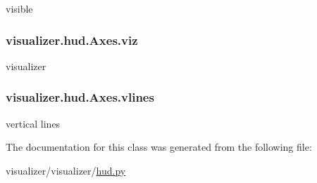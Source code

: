 visible 

\subsubsection[{\texorpdfstring{viz}{viz}}]{\setlength{\rightskip}{0pt plus 5cm}visualizer.\+hud.\+Axes.\+viz}\hypertarget{classvisualizer_1_1hud_1_1Axes_a2ef949d1777934b9f320356f5f78f250}{}\label{classvisualizer_1_1hud_1_1Axes_a2ef949d1777934b9f320356f5f78f250}


visualizer 

\subsubsection[{\texorpdfstring{vlines}{vlines}}]{\setlength{\rightskip}{0pt plus 5cm}visualizer.\+hud.\+Axes.\+vlines}\hypertarget{classvisualizer_1_1hud_1_1Axes_a31139415c2a30668137184f4ef88d948}{}\label{classvisualizer_1_1hud_1_1Axes_a31139415c2a30668137184f4ef88d948}


vertical lines 



The documentation for this class was generated from the following file\+:\begin{DoxyCompactItemize}
\item 
visualizer/visualizer/\hyperlink{hud_8py}{hud.\+py}\end{DoxyCompactItemize}
